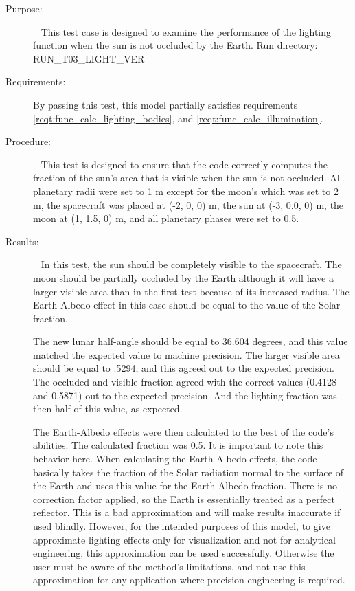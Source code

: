\label{test:sun_behind}
\begin{description}
\item[Purpose:] \ \newline
This test case is designed to examine the performance of the lighting
function when the sun is not occluded by the Earth.
\newline
Run directory: RUN\_T03\_LIGHT\_VER \newline
\item[Requirements:]%
By passing this test, this model partially satisfies requirements
\mbox{\ref{reqt:func_calc_lighting_bodies}}, and
\mbox{\ref{reqt:func_calc_illumination}}.

\item[Procedure:]\ \newline
This test is designed to ensure that the code correctly computes the fraction
of the sun's area that is visible when the sun is not occluded.
All planetary radii were set to 1 m except for the moon's which was
set to 2 m, the spacecraft was placed at (-2, 0, 0) m, the sun at (-3, 0.0, 0)
m, the moon at (1, 1.5, 0) m, and all planetary phases were set to 0.5.
\item[Results:]\ \newline
In this test, the sun should be completely visible to the spacecraft.  The
moon should be partially occluded by the Earth although it will have a larger
visible area than in the first test because of its increased radius.  The
Earth-Albedo effect in this case should be equal to the value of the Solar
fraction.

The new lunar half-angle should be equal to 36.604 degrees, and this value
matched the expected value to machine precision.  The larger visible area
should be equal to .5294, and this agreed out to the expected precision.
The occluded and visible fraction agreed with the correct values (0.4128
and 0.5871) out to the expected precision.  And the lighting fraction was
then half of this value, as expected.

The Earth-Albedo effects were then calculated to the best of the code's
abilities.  The calculated fraction was 0.5.  It is important to note this
behavior here.  When calculating the Earth-Albedo effects, the code basically
takes the fraction of the Solar radiation normal to the surface of the Earth
and uses this value for the Earth-Albedo fraction.  There is no correction
factor applied, so the Earth is essentially treated as a perfect reflector.
This is a bad approximation and will make results inaccurate if used blindly.
However, for the intended purposes of this model, to give approximate lighting
effects only for visualization and not for analytical engineering, this
approximation can be used successfully. Otherwise the user must be aware of the
method's limitations, and not use this approximation for any application where
precision engineering is required.


\end{description}

